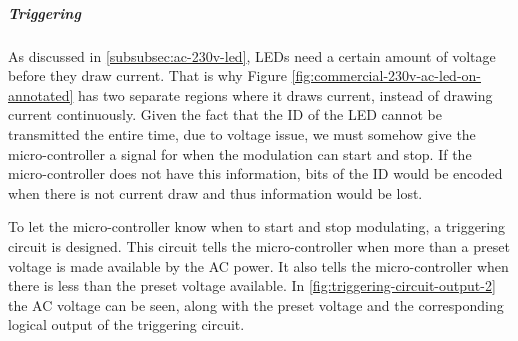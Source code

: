 	\subparagraph{Triggering}
	\label{subsubsec:triggering}

	As discussed in \autoref{subsubsec:ac-230v-led}, LEDs need a certain amount of voltage before they draw current.
	That is why Figure \ref{fig:commercial-230v-ac-led-on-annotated} has two separate regions where it draws current, instead of drawing current continuously.
	Given the fact that the ID of the LED cannot be transmitted the entire time, due to voltage issue, we must somehow give the micro-controller a signal for when the modulation can start and stop.
	If the micro-controller does not have this information, bits of the ID would be encoded when there is not current draw and thus information would be lost.

	To let the micro-controller know when to start and stop modulating, a triggering circuit is designed.
	This circuit tells the micro-controller when more than a preset voltage is made available by the AC power.
	It also tells the micro-controller when there is less than the preset voltage available.
	In \autoref{fig:triggering-circuit-output-2} the AC voltage can be seen, along with the preset voltage and the corresponding logical output of the triggering circuit.



